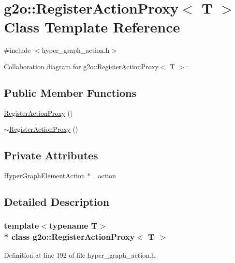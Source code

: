 \hypertarget{classg2o_1_1RegisterActionProxy}{}\section{g2o\+:\+:Register\+Action\+Proxy$<$ T $>$ Class Template Reference}
\label{classg2o_1_1RegisterActionProxy}


{\ttfamily \#include $<$hyper\+\_\+graph\+\_\+action.\+h$>$}



Collaboration diagram for g2o\+:\+:Register\+Action\+Proxy$<$ T $>$\+:
\subsection*{Public Member Functions}
\begin{DoxyCompactItemize}
\item 
\hyperlink{classg2o_1_1RegisterActionProxy_a2998e33a5b4627b38b58a493c16d65e6}{Register\+Action\+Proxy} ()
\item 
\hyperlink{classg2o_1_1RegisterActionProxy_a73e8eacc965c3e9bb2084570c6b67eed}{$\sim$\+Register\+Action\+Proxy} ()
\end{DoxyCompactItemize}
\subsection*{Private Attributes}
\begin{DoxyCompactItemize}
\item 
\hyperlink{classg2o_1_1HyperGraphElementAction}{Hyper\+Graph\+Element\+Action} $\ast$ \hyperlink{classg2o_1_1RegisterActionProxy_abab95a1b707467ceebfe1448e40202b8}{\+\_\+action}
\end{DoxyCompactItemize}


\subsection{Detailed Description}
\subsubsection*{template$<$typename T$>$\\*
class g2o\+::\+Register\+Action\+Proxy$<$ T $>$}



Definition at line 192 of file hyper\+\_\+graph\+\_\+action.\+h.



